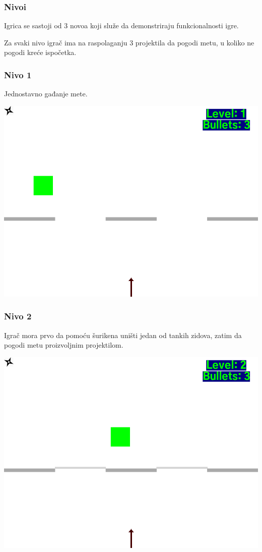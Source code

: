 \documentclass{beamer}
\begin{document}
\begin{frame}
	\frametitle{Nivoi}
	\Large
	Igrica se sastoji od 3 novoa koji služe da demonstriraju funkcionalnosti igre.
	
	Za svaki nivo igrač ima na raspolaganju 3 projektila da pogodi metu, u koliko ne pogodi kreće ispočetka.
\end{frame}

\begin{frame}
	\frametitle{Nivo 1}
	\Large
	Jednostavno gađanje mete.
	
	\vspace{0.5cm}
	
	\begin{center}
		\includegraphics[scale=0.25]{./images/lvl1.png}
	\end{center}
\end{frame}
\begin{frame}
	\frametitle{Nivo 2}
	\Large
	Igrač mora prvo da pomoću šurikena uništi jedan od tankih zidova, zatim da pogodi metu proizvoljnim projektilom.
	
	\vspace{0.5cm}
	
	\begin{center}
		\includegraphics[scale=0.25]{./images/lvl2.png}
	\end{center}
\end{frame}
\end{document}
